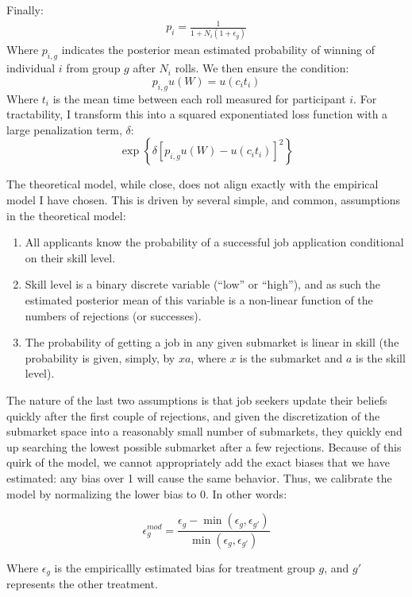 \documentclass[a4paper,12pt]{article}
\begin{document}
Finally:
\begin{align*}
  p_{i} = \frac{1}{1 + N_i(1 + \epsilon_g)}
\end{align*}
Where $p_{i,g}$ indicates the posterior mean estimated probability of winning of individual $i$ from group $g$ after $N_i$ rolls. We then ensure the condition:
$$
p_{i,g} u\left( W \right) = u\left( c_it_i \right)
$$
Where $t_i$ is the mean time between each roll measured for participant $i$. For tractability, I transform this into a squared exponentiated loss function with a large penalization term, $\delta$:
$$
\exp \left\{ \delta \left[ p_{i,g} u\left( W \right) - u\left( c_it_i \right) \right]^2 \right\}
$$

The theoretical model, while close, does not align exactly with the empirical model I have chosen. This is driven by several simple, and common, assumptions in the theoretical model:
%
\begin{enumerate}
\item All applicants know the probability of a successful job application conditional on their skill level.
\item Skill level is a binary discrete variable (``low'' or ``high''), and as such the estimated posterior mean of this variable is a non-linear function of the numbers of rejections (or successes).
\item The probability of getting a job in any given submarket is linear in skill (the probability is given, simply, by $xa$, where $x$ is the submarket and $a$ is the skill level).
\end{enumerate}

The nature of the last two assumptions is that job seekers update their beliefs quickly after the first couple of rejections, and given the discretization of the submarket space into a reasonably small number of submarkets, they quickly end up searching the lowest possible submarket after a few rejections. Because of this quirk of the model, we cannot appropriately add the exact biases that we have estimated: any bias over 1 will cause the same behavior. Thus, we calibrate the model by normalizing the lower bias to 0. In other words:

\begin{equation} \label {eq:epsilon-model}
\epsilon^{mod}_{g} = \frac{\epsilon_g - \min(\epsilon_g, \epsilon_{g'})}{\min (\epsilon_g, \epsilon_{g'})}
\end{equation}

Where $\epsilon_{g}$ is the empiricallly estimated bias for treatment group $g$, and $g'$ represents the other treatment.
\end{document}

